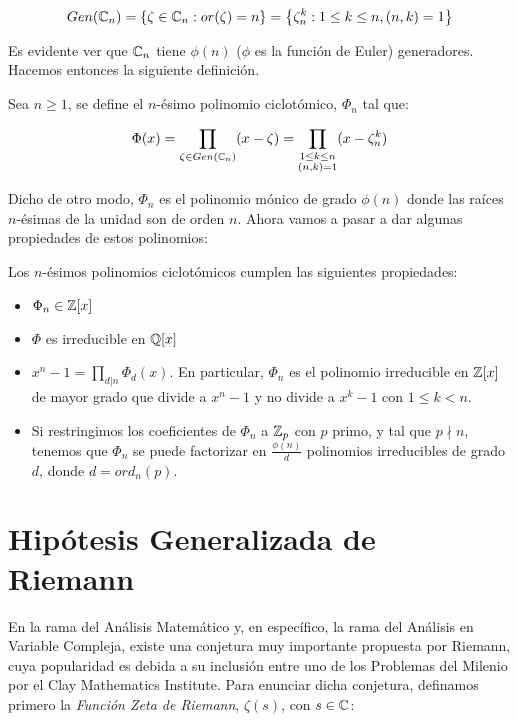 \[ Gen(\mathbb{C}_n) = \left\lbrace \zeta \in \mathbb{C}_n : or(\zeta) = n \right\rbrace = \left\lbrace \zeta_n^k : 1 \leq k \leq n, (n, k) = 1 \right\rbrace \]

Es evidente ver que $\mathbb{C}_n$ tiene $\phi(n)$ ($\phi$ es la función de Euler) generadores. Hacemos entonces la siguiente definición.

\begin{definicion}
	Sea $n \geq 1$, se define el $n$-ésimo polinomio ciclotómico, $\Phi_n$ tal que:
	
	\[ \Phi(x) = \prod_{\zeta \in Gen(\mathbb{C}_n)}(x - \zeta) = \prod_{\substack{1 \leq k \leq n \\ (n, k) = 1}}(x - \zeta_n^k) \]
\end{definicion}

Dicho de otro modo, $\Phi_n$ es el polinomio mónico de grado $\phi(n)$ donde las raíces $n$-ésimas de la unidad son de orden $n$. Ahora vamos a pasar a dar algunas propiedades de estos polinomios:

\begin{proposicion}
	Los $n$-ésimos polinomios ciclotómicos cumplen las siguientes propiedades:
	
	\begin{itemize}
		\item $\Phi_n \in \mathbb{Z}[x]$
		\item $\Phi$ es irreducible en $\mathbb{Q}[x]$
		\item $x^n - 1 = \prod_{d|n}\Phi_d(x)$. En particular, $\Phi_n$ es el polinomio irreducible en $\mathbb{Z}[x]$ de mayor grado que divide a $x^n - 1$ y no divide a $x^k - 1$ con $1 \leq k < n$.
		\item Si restringimos los coeficientes de $\Phi_n$ a $\mathbb{Z}_p$ con $p$ primo, y tal que $p \nmid n$, tenemos que $\Phi_n$ se puede factorizar en $\frac{\phi(n)}{d}$ polinomios irreducibles de grado $d$, donde $d = ord_n(p)$.
	\end{itemize}
\end{proposicion}

\section{Hipótesis Generalizada de Riemann}

En la rama del Análisis Matemático y, en específico, la rama del Análisis en Variable Compleja, existe una conjetura muy importante propuesta por Riemann, cuya popularidad es debida a su inclusión entre uno de los Problemas del Milenio por el Clay Mathematics Institute. Para enunciar dicha conjetura, definamos primero la \textit{Función Zeta de Riemann}, $\zeta(s)$, con $s \in \mathbb{C}$:

